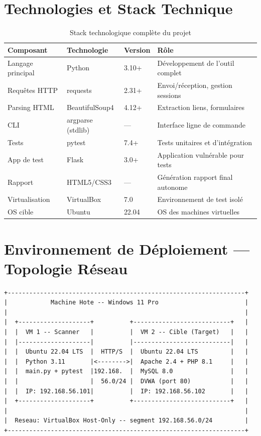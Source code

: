 \documentclass[12pt,a4paper]{report}
\newcommand{\hdr}[1]{\cellcolor{gray!15}\textbf{#1}}
\newcommand{\rowA}{\rowcolor{gray!8}}
\begin{document}
\section{Technologies et Stack Technique}

\begin{table}[h!]
\centering
\caption{Stack technologique complète du projet}
\begin{tabular}{p{3cm}p{2.8cm}p{1.5cm}p{4.5cm}}
\toprule
\hdr{Composant} & \hdr{Technologie} & \hdr{Version} & \hdr{Rôle} \\
\midrule
Langage principal & Python            & 3.10+  & Développement de l'outil complet \\
\rowA Requêtes HTTP & requests        & 2.31+  & Envoi/réception, gestion sessions \\
Parsing HTML      & BeautifulSoup4    & 4.12+  & Extraction liens, formulaires \\
\rowA CLI         & argparse (stdlib) & —      & Interface ligne de commande \\
Tests             & pytest            & 7.4+   & Tests unitaires et d'intégration \\
\rowA App de test & Flask             & 3.0+   & Application vulnérable pour tests \\
Rapport           & HTML5/CSS3        & —      & Génération rapport final autonome \\
\rowA Virtualisation & VirtualBox     & 7.0    & Environnement de test isolé \\
OS cible          & Ubuntu            & 22.04  & OS des machines virtuelles \\
\bottomrule
\end{tabular}
\end{table}

\section{Environnement de Déploiement — Topologie Réseau}

\begin{lstlisting}[caption={Topologie de l'environnement de test virtualisé}]
+------------------------------------------------------------------+
|            Machine Hote -- Windows 11 Pro                        |
|                                                                  |
|  +--------------------+          +---------------------------+   |
|  |  VM 1 -- Scanner   |          |  VM 2 -- Cible (Target)   |   |
|  |--------------------|          |---------------------------|   |
|  |  Ubuntu 22.04 LTS  |  HTTP/S  |  Ubuntu 22.04 LTS         |   |
|  |  Python 3.11       |<-------->|  Apache 2.4 + PHP 8.1     |   |
|  |  main.py + pytest  |192.168.  |  MySQL 8.0                |   |
|  |                    |  56.0/24 |  DVWA (port 80)           |   |
|  |  IP: 192.168.56.101|          |  IP: 192.168.56.102       |   |
|  +--------------------+          +---------------------------+   |
|                                                                  |
|  Reseau: VirtualBox Host-Only -- segment 192.168.56.0/24         |
+------------------------------------------------------------------+
\end{lstlisting}
\end{document}
